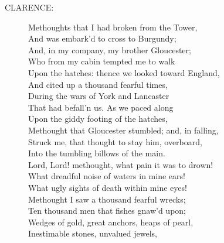 \documentclass{article}
\begin{document}
\begin{description}
\item[CLARENCE:] 
\hspace{1pt}Methoughts that I had broken from the Tower,\\
\hspace{1pt}And was embark'd to cross to Burgundy;\\
\hspace{1pt}And, in my company, my brother Gloucester;\\
\hspace{1pt}Who from my cabin tempted me to walk\\
\hspace{1pt}Upon the hatches: thence we looked toward England,\\
\hspace{1pt}And cited up a thousand fearful times,\\
\hspace{1pt}During the wars of York and Lancaster\\
\hspace{1pt}That had befall'n us. As we paced along\\
\hspace{1pt}Upon the giddy footing of the hatches,\\
\hspace{1pt}Methought that Gloucester stumbled; and, in falling,\\
\hspace{1pt}Struck me, that thought to stay him, overboard,\\
\hspace{1pt}Into the tumbling billows of the main.\\
\hspace{1pt}Lord, Lord! methought, what pain it was to drown!\\
\hspace{1pt}What dreadful noise of waters in mine ears!\\
\hspace{1pt}What ugly sights of death within mine eyes!\\
\hspace{1pt}Methought I saw a thousand fearful wrecks;\\
\hspace{1pt}Ten thousand men that fishes gnaw'd upon;\\
\hspace{1pt}Wedges of gold, great anchors, heaps of pearl,\\
\hspace{1pt}Inestimable stones, unvalued jewels,\\

\end{description}
\end{document}
